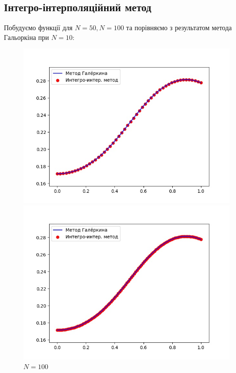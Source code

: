 \documentclass[14pt,a4paper]{scrartcl}
\begin{document}
\subsection{Інтегро-інтерполяційний метод}
	Побудуємо функції для $N = 50, N = 100$ та порівняємо з результатом метода Гальоркіна при $N = 10$:
	
	
	\begin{figure}[h]
		\begin{center}
			\begin{minipage}[h]{0.45\linewidth}
				\includegraphics[width=1\linewidth]{photo1_1.jpg}
				\caption{$N = 50$} %
				\label{ris:experimoriginal} %
			\end{minipage}
			\hfill
			\begin{minipage}[h]{0.45\linewidth}
				\includegraphics[width=1\linewidth]{photo2_1.jpg}
				\caption{$N = 100$}
				\label{ris:experimcoded}
			\end{minipage}
		\end{center}
	\end{figure}
\end{document}
